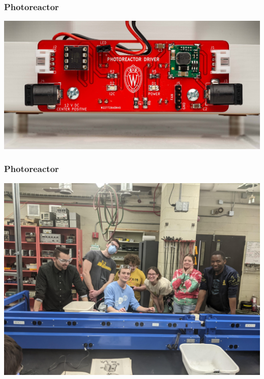\documentclass{presentation}
\begin{document}
\begin{frame}\frametitle{Photoreactor}
  \includegraphics[width=\textwidth]{"./Philip (27).jpg"}
\end{frame}

\begin{frame}\frametitle{Photoreactor}
  \includegraphics[width=\textwidth]{"./PXL_20230203_192355031.jpg"}
\end{frame}
\end{document}
